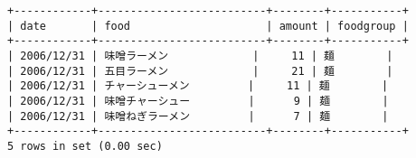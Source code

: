 \documentclass{jlreq}
\begin{document}
\begin{enumerate}
\begin{lstlisting}
+------------+--------------------------+--------+-----------+
| date       | food                     | amount | foodgroup |
+------------+--------------------------+--------+-----------+
| 2006/12/31 | 味噌ラーメン             |     11 | 麺        |
| 2006/12/31 | 五目ラーメン             |     21 | 麺        |
| 2006/12/31 | チャーシューメン         |     11 | 麺        |
| 2006/12/31 | 味噌チャーシュー         |      9 | 麺        |
| 2006/12/31 | 味噌ねぎラーメン         |      7 | 麺        |
+------------+--------------------------+--------+-----------+
5 rows in set (0.00 sec)
\end{lstlisting}
\end{enumerate}
\end{document}
